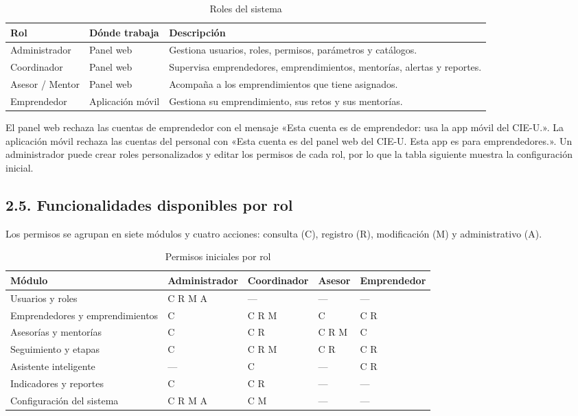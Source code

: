 \documentclass[12pt,letterpaper]{article}
\begin{document}
\begin{table}[H]\singlespacing\small
\caption{Roles del sistema}
\begin{tabularx}{\textwidth}{XXX}
\toprule
\textbf{Rol} & \textbf{Dónde trabaja} & \textbf{Descripción} \\
\midrule
\relax Administrador & Panel web & Gestiona usuarios, roles, permisos, parámetros y catálogos. \\
\relax Coordinador & Panel web & Supervisa emprendedores, emprendimientos, mentorías, alertas y reportes. \\
\relax Asesor / Mentor & Panel web & Acompaña a los emprendimientos que tiene asignados. \\
\relax Emprendedor & Aplicación móvil & Gestiona su emprendimiento, sus retos y sus mentorías. \\
\bottomrule
\end{tabularx}
\end{table}

El panel web rechaza las cuentas de emprendedor con el mensaje «Esta cuenta es de emprendedor: usa la app móvil del CIE-U.». La aplicación móvil rechaza las cuentas del personal con «Esta cuenta es del panel web del CIE-U. Esta app es para emprendedores.». Un administrador puede crear roles personalizados y editar los permisos de cada rol, por lo que la tabla siguiente muestra la configuración inicial.

\subsection*{2.5. Funcionalidades disponibles por rol}


Los permisos se agrupan en siete módulos y cuatro acciones: consulta (C), registro (R), modificación (M) y administrativo (A).

\begin{table}[H]\singlespacing\small
\caption{Permisos iniciales por rol}
\begin{tabularx}{\textwidth}{XXXXX}
\toprule
\textbf{Módulo} & \textbf{Administrador} & \textbf{Coordinador} & \textbf{Asesor} & \textbf{Emprendedor} \\
\midrule
\relax Usuarios y roles & C R M A & — & — & — \\
\relax Emprendedores y emprendimientos & C & C R M & C & C R \\
\relax Asesorías y mentorías & C & C R & C R M & C \\
\relax Seguimiento y etapas & C & C R M & C R & C R \\
\relax Asistente inteligente & — & C & — & C R \\
\relax Indicadores y reportes & C & C R & — & — \\
\relax Configuración del sistema & C R M A & C M & — & — \\
\bottomrule
\end{tabularx}
\end{table}
\end{document}
